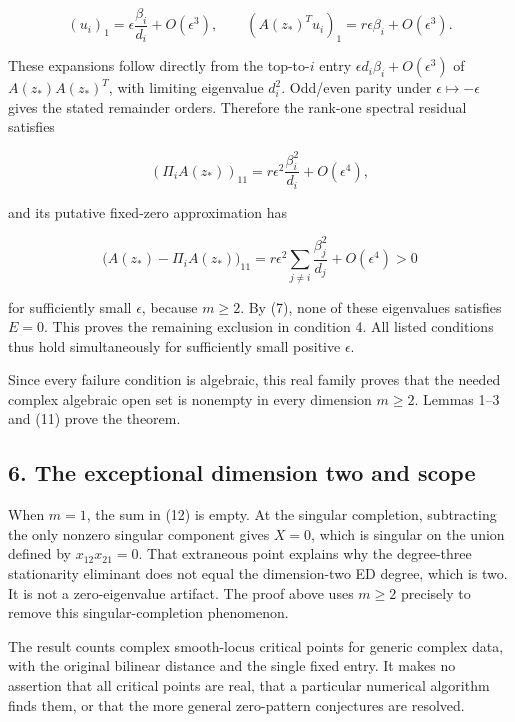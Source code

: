 \documentclass[10pt,a4paper]{article}
\begin{document}
\[ (u_i)_1=\epsilon\frac{\beta_i}{d_i}+O(\epsilon^3),\qquad
(A(z_*)^Tu_i)_1=r\epsilon\beta_i+O(\epsilon^3).\]

These expansions follow directly from the top-to-\(i\) entry
\(\epsilon d_i\beta_i+O(\epsilon^3)\) of \(A(z_*)A(z_*)^T\), with
limiting eigenvalue \(d_i^2\). Odd/even parity under
\(\epsilon\mapsto-\epsilon\) gives the stated remainder orders.
Therefore the rank-one spectral residual satisfies

\nopagebreak[4]

\[ (\Pi_i A(z_*))_{11}=r\epsilon^2\frac{\beta_i^2}{d_i}+O(\epsilon^4),\]

and its putative fixed-zero approximation has

\nopagebreak[4]

\[\bigl(A(z_*)-\Pi_i A(z_*)\bigr)_{11}
=r\epsilon^2\sum_{j\ne i}\frac{\beta_j^2}{d_j}+O(\epsilon^4)>0\tag{12}\]

for sufficiently small \(\epsilon\), because \(m\ge2\). By (7), none of
these eigenvalues satisfies \(E=0\). This proves the remaining exclusion
in condition 4. All listed conditions thus hold simultaneously for
sufficiently small positive \(\epsilon\).

Since every failure condition is algebraic, this real family proves that
the needed complex algebraic open set is nonempty in every dimension
\(m\ge2\). Lemmas 1--3 and (11) prove the theorem.


\subsection{6. The exceptional dimension two and
scope}\label{the-exceptional-dimension-two-and-scope}

When \(m=1\), the sum in (12) is empty. At the singular completion,
subtracting the only nonzero singular component gives \(X=0\), which is
singular on the union defined by \(x_{12}x_{21}=0\). That extraneous
point explains why the degree-three stationarity eliminant does not
equal the dimension-two ED degree, which is two. It is not a
zero-eigenvalue artifact. The proof above uses \(m\ge2\) precisely to
remove this singular-completion phenomenon.

The result counts complex smooth-locus critical points for generic
complex data, with the original bilinear distance and the single fixed
entry. It makes no assertion that all critical points are real, that a
particular numerical algorithm finds them, or that the more general
zero-pattern conjectures are resolved.
\end{document}
